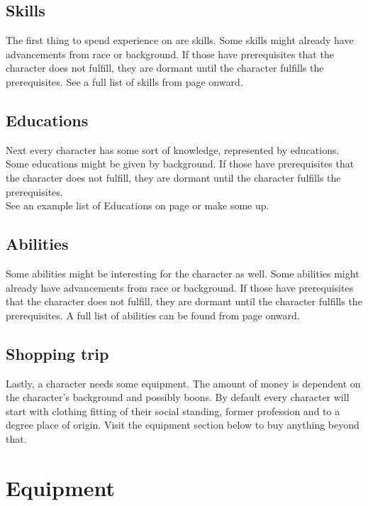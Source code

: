 \documentclass[12pt,a4paper,openany]{book}
\begin{document}
	\section{Skills}
	The first thing to spend experience on are skills. Some skills might already have advancements from race or background. If those have prerequisites that the character does not fulfill, they are dormant until the character fulfills the prerequisites. See a full list of skills from page \pageref{skilllist} onward.
	\section{Educations}
	Next every character has some sort of knowledge, represented by educations. Some educations might be given by background. If those have prerequisites that the character does not fulfill, they are dormant until the character fulfills the prerequisites.\\
	See an example list of Educations on page \pageref{eds-explanation} or make some up.
	\section{Abilities}
	Some abilities might be interesting for the character as well. Some abilities might already have advancements from race or background. If those have prerequisites that the character does not fulfill, they are dormant until the character fulfills the prerequisites. A full list of abilities can be found from page \pageref{abilitylist} onward.
	\section{Shopping trip}
	Lastly, a character needs some equipment. The amount of money is dependent on the character’s background and possibly boons. By default every character will start with clothing fitting of their social standing, former profession and to a degree place of origin. Visit the equipment section below to buy anything beyond that.

	\chapter{Equipment}
	
	
	
	
	
	

	
	
\end{document}
